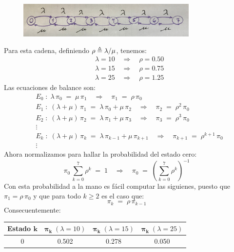 \documentclass[ a4paper, twoside, 11pt]{article}
\begin{document}
\begin{problem}
\begin{enumerate}[label=\textbf{\alph*)}]
\begin{figure}[htb]
\centering
\includegraphics[width=0.8\textwidth]{problema-1-A.jpg}
\end{figure}

Para esta cadena, definiendo $\rho \triangleq \lambda / \mu$, tenemos: 
\begin{align*}
& \lambda = 10 \quad \Longrightarrow \quad \rho = 0.50 \\
& \lambda = 15 \quad \Longrightarrow \quad \rho = 0.75 \\
& \lambda = 25 \quad \Longrightarrow \quad \rho = 1.25
\end{align*}
Las ecuaciones de balance son: 
\begin{align*}
& E_0 \; \colon \; \lambda \, \pi_0 \; = \; \mu \, \pi_1
\quad \Longrightarrow \quad
\pi_1 \; = \; \rho \, \pi_0 \\
& E_1 \; \colon \; (\lambda + \mu) \, \pi_1
\; = \; \lambda \, \pi_0 + \mu \, \pi_2
\quad \Longrightarrow \quad
\pi_2 \; = \; \rho^2 \, \pi_0 \\
& E_2 \; \colon \; (\lambda + \mu) \, \pi_2
\; = \; \lambda \, \pi_1 + \mu \, \pi_3
\quad \Longrightarrow \quad
\pi_3 \; = \; \rho^3 \, \pi_0 \\
& \vdots \\
& E_k \; \colon \; (\lambda + \mu) \, \pi_{k} \; = \; \lambda \, \pi_{k-1} + \mu \, \pi_{k+1} \quad \Longrightarrow \quad
\pi_{k+1} \; = \; \rho^{k+1} \, \pi_0 \\
& \vdots
\end{align*}
Ahora normalizamos para hallar la probabilidad del estado cero: 
\[
\pi_0 \, \sum_{k=0}^7 \rho^k \; = \; 1 \quad \Longrightarrow \quad
\pi_0 \; = \; \left( \sum_{k=0}^7 \rho^k \right)^{-1}
\]
Con esta probabilidad a la mano es f\'acil computar las siguienes, puesto que $\pi_1 = \rho \, \pi_0$ y que para todo $k \geq 2$ es el caso que: 
\[
\pi_{k} \; = \; \rho \, \pi_{k-1}
\]
Consecuentemente: 
\begin{table}[htb]
\centering
\begin{tabular}{|c|c|c|c|}
\hline
\textbf{Estado} $\boldsymbol{k}$ & $\boldsymbol{\pi_k} \; ( \lambda = 10 )$ & $\boldsymbol{\pi_k} \; ( \lambda = 15 )$ & $\boldsymbol{\pi_k} \; ( \lambda = 25 )$ \\ \hline
0 & 0.502 & 0.278 & 0.050 \\ \hline

\end{tabular}
\end{table}
\end{enumerate}
\end{problem}
\end{document}

